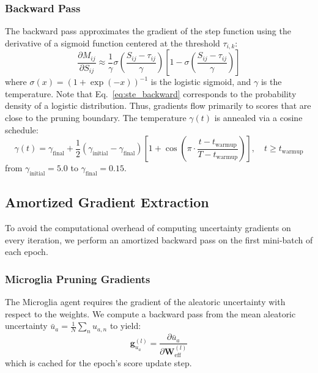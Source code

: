 \documentclass[11pt]{article}
\begin{document}
\subsubsection{Backward Pass}
The backward pass approximates the gradient of the step function using the derivative of a sigmoid function centered at the threshold $\tau_{i, k}$:
\begin{equation}\label{eq:ste_backward}
    \frac{\partial M_{ij}}{\partial S_{ij}} \approx \frac{1}{\gamma} \sigma\left(\frac{S_{ij} - \tau_{ij}}{\gamma}\right) \left[ 1 - \sigma\left(\frac{S_{ij} - \tau_{ij}}{\gamma}\right) \right]
\end{equation}
where $\sigma(x) = (1 + \exp(-x))^{-1}$ is the logistic sigmoid, and $\gamma$ is the temperature. Note that Eq.~\ref{eq:ste_backward} corresponds to the probability density of a logistic distribution. Thus, gradients flow primarily to scores that are close to the pruning boundary. The temperature $\gamma(t)$ is annealed via a cosine schedule:
\begin{equation}\label{eq:gamma_anneal}
    \gamma(t) = \gamma_{\text{final}} + \frac{1}{2}(\gamma_{\text{initial}} - \gamma_{\text{final}})\left[1 + \cos\!\left(\pi \cdot \frac{t - t_{\text{warmup}}}{T - t_{\text{warmup}}}\right)\right], \quad t \ge t_{\text{warmup}}
\end{equation}
from $\gamma_{\text{initial}} = 5.0$ to $\gamma_{\text{final}} = 0.15$.

\subsection{Amortized Gradient Extraction}\label{subsec:amortised}

To avoid the computational overhead of computing uncertainty gradients on every iteration, we perform an amortized backward pass on the first mini-batch of each epoch.

\subsubsection{Microglia Pruning Gradients}

The Microglia agent requires the gradient of the aleatoric uncertainty with respect to the weights. We compute a backward pass from the mean aleatoric uncertainty $\bar{u}_a = \frac{1}{N}\sum_n u_{a,n}$ to yield:
\begin{equation}\label{eq:grad_ua}
    \bm{g}_{u_a}^{(l)} = \frac{\partial \bar{u}_a}{\partial \bm{W}_{\text{eff}}^{(l)}}
\end{equation}
which is cached for the epoch's score update step.
\end{document}
